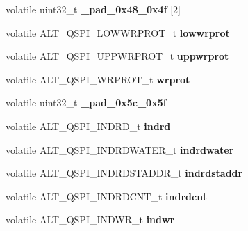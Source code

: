 \begin{DoxyCompactItemize}
volatile uint32\+\_\+t {\bfseries \+\_\+pad\+\_\+0x48\+\_\+0x4f} \mbox{[}2\mbox{]}
\item 
\mbox{\label{structALT__QSPI__s_a10d18877a0aa5b1230351ca1465b2542}} 
volatile A\+L\+T\+\_\+\+Q\+S\+P\+I\+\_\+\+L\+O\+W\+W\+R\+P\+R\+O\+T\+\_\+t {\bfseries lowwrprot}
\item 
\mbox{\label{structALT__QSPI__s_a738833f61e54d085524d8a4b6a0e7dee}} 
volatile A\+L\+T\+\_\+\+Q\+S\+P\+I\+\_\+\+U\+P\+P\+W\+R\+P\+R\+O\+T\+\_\+t {\bfseries uppwrprot}
\item 
\mbox{\label{structALT__QSPI__s_abb214d6a6bc94f99a6922802c623535f}} 
volatile A\+L\+T\+\_\+\+Q\+S\+P\+I\+\_\+\+W\+R\+P\+R\+O\+T\+\_\+t {\bfseries wrprot}
\item 
\mbox{\label{structALT__QSPI__s_ae20305a0dcf4d47aef6452f9dd62c73f}} 
volatile uint32\+\_\+t {\bfseries \+\_\+pad\+\_\+0x5c\+\_\+0x5f}
\item 
\mbox{\label{structALT__QSPI__s_aff07bdf567dced8505a4f51b57da185c}} 
volatile A\+L\+T\+\_\+\+Q\+S\+P\+I\+\_\+\+I\+N\+D\+R\+D\+\_\+t {\bfseries indrd}
\item 
\mbox{\label{structALT__QSPI__s_a9d7f7c0876ea746397094ae77df95e7b}} 
volatile A\+L\+T\+\_\+\+Q\+S\+P\+I\+\_\+\+I\+N\+D\+R\+D\+W\+A\+T\+E\+R\+\_\+t {\bfseries indrdwater}
\item 
\mbox{\label{structALT__QSPI__s_ab81b12f68cfc937e3d237f0b0fe2d2d0}} 
volatile A\+L\+T\+\_\+\+Q\+S\+P\+I\+\_\+\+I\+N\+D\+R\+D\+S\+T\+A\+D\+D\+R\+\_\+t {\bfseries indrdstaddr}
\item 
\mbox{\label{structALT__QSPI__s_af940acfd4dc86b83671e45f0d61a9ad2}} 
volatile A\+L\+T\+\_\+\+Q\+S\+P\+I\+\_\+\+I\+N\+D\+R\+D\+C\+N\+T\+\_\+t {\bfseries indrdcnt}
\item 
\mbox{\label{structALT__QSPI__s_aa554e5ca1dceb795832245b679c6b6bc}} 
volatile A\+L\+T\+\_\+\+Q\+S\+P\+I\+\_\+\+I\+N\+D\+W\+R\+\_\+t {\bfseries indwr}
\item 
\mbox{\label{structALT__QSPI__s_ab1ed0c578cfbabbb246d8cad4325e352}} 

\end{DoxyCompactItemize}

